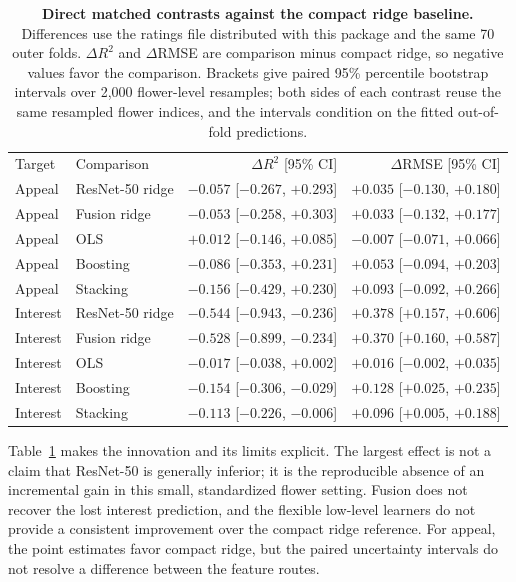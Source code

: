 \documentclass[10pt,letterpaper]{article}
\newlength\savedwidth
\newcommand\thickhline{\noalign{\global\savedwidth\arrayrulewidth\global\arrayrulewidth 2pt}\hline\noalign{\global\arrayrulewidth\savedwidth}}
\begin{document}
\begin{table}[!ht]
\centering
\caption{\textbf{Direct matched contrasts against the compact ridge baseline.}
Differences use the ratings file distributed with this package and the same 70 outer folds.
$\Delta R^2$ and $\Delta$RMSE are comparison minus compact ridge, so negative
values favor the comparison. Brackets give paired 95\% percentile bootstrap
intervals over 2{,}000 flower-level resamples; both sides of each contrast reuse
the same resampled flower indices, and the intervals condition on the fitted
out-of-fold predictions.}
\begin{tabular}{l l r r}
\hline
Target & Comparison & $\Delta R^2$ [95\% CI] & $\Delta$RMSE [95\% CI]\\ \thickhline
Appeal & ResNet-50 ridge & $-0.057$ [$-0.267$, $+0.293$] & $+0.035$ [$-0.130$, $+0.180$]\\
Appeal & Fusion ridge & $-0.053$ [$-0.258$, $+0.303$] & $+0.033$ [$-0.132$, $+0.177$]\\
Appeal & OLS & $+0.012$ [$-0.146$, $+0.085$] & $-0.007$ [$-0.071$, $+0.066$]\\
Appeal & Boosting & $-0.086$ [$-0.353$, $+0.231$] & $+0.053$ [$-0.094$, $+0.203$]\\
Appeal & Stacking & $-0.156$ [$-0.429$, $+0.230$] & $+0.093$ [$-0.092$, $+0.266$]\\
Interest & ResNet-50 ridge & $-0.544$ [$-0.943$, $-0.236$] & $+0.378$ [$+0.157$, $+0.606$]\\
Interest & Fusion ridge & $-0.528$ [$-0.899$, $-0.234$] & $+0.370$ [$+0.160$, $+0.587$]\\
Interest & OLS & $-0.017$ [$-0.038$, $+0.002$] & $+0.016$ [$-0.002$, $+0.035$]\\
Interest & Boosting & $-0.154$ [$-0.306$, $-0.029$] & $+0.128$ [$+0.025$, $+0.235$]\\
Interest & Stacking & $-0.113$ [$-0.226$, $-0.006$] & $+0.096$ [$+0.005$, $+0.188$]\\ \hline
\end{tabular}
\label{table_contrasts}
\end{table}




Table~\ref{table_contrasts} makes the innovation and its limits explicit. The largest effect is not a claim that ResNet-50 is generally inferior; it is the reproducible absence of an incremental gain in this small, standardized flower setting. Fusion does not recover the lost interest prediction, and the flexible low-level learners do not provide a consistent improvement over the compact ridge reference. For appeal, the point estimates favor compact ridge, but the paired uncertainty intervals do not resolve a difference between the feature routes.
\end{document}
